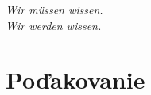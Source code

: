 \thispagestyle{empty}
\vspace*{\fill}

\begin{center}
\settowidth{}
\parbox{\longest}{
  \hrulefill\hspace{0.2cm} \decofourleft\decofourright \hspace{0.2cm} \hrulefill\par
  \raggedright{
  \itshape
  	Wir müssen wissen. \\ Wir werden wissen.\par
  }   
  \par
  \hrulefill\hspace{0.2cm} \decofourleft\decofourright\hspace{0.2cm} \hrulefill\par
}
\end{center}


\vspace*{\fill}
\section*{Poďakovanie}
%
%
%

\vspace{3cm}